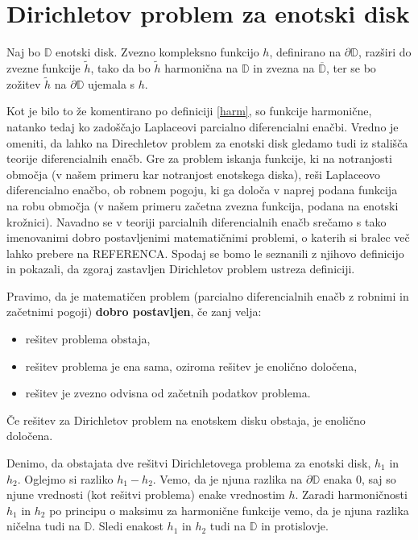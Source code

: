 \documentclass[mat1]{fmfdelo}
\begin{document}
\section{Dirichletov problem za enotski disk}
    \begin{pro}
        Naj bo $\mathbb{D}$ enotski disk. Zvezno kompleksno funkcijo $h$, definirano na $\partial \mathbb{D}$, razširi do zvezne funkcije $\widetilde{h}$, tako da bo $\widetilde{h}$ harmonična na $\mathbb{D}$ in zvezna na $\overline{\mathbb{D}}$, ter se bo zožitev $\widetilde{h}$ na $\partial \mathbb{D}$ ujemala s $h$.
    \end{pro}

    \begin{opomba}
        Kot je bilo to že komentirano po definiciji \ref{harm}, so funkcije harmonične, natanko tedaj ko zadoščajo Laplaceovi parcialno diferencialni enačbi. 
        Vredno je omeniti, da lahko na Direchletov problem za enotski disk gledamo tudi iz stališča teorije diferencialnih enačb. Gre za problem iskanja funkcije, ki na notranjosti območja (v našem primeru kar notranjost enotskega diska), reši Laplaceovo diferencialno enačbo, ob robnem pogoju, ki ga določa v naprej podana funkcija na robu območja (v našem primeru začetna zvezna funkcija, podana na enotski krožnici). 
        Navadno se v teoriji parcialnih diferencialnih enačb srečamo s tako imenovanimi dobro postavljenimi matematičnimi problemi, o katerih si bralec več lahko prebere na REFERENCA. 
        Spodaj se bomo le seznanili z njihovo definicijo in pokazali, da zgoraj zastavljen Dirichletov problem ustreza definiciji. 
    \end{opomba}

    \begin{definicija}[J. Hadamard 1902]
        Pravimo, da je matematičen problem (parcialno diferencialnih enačb z robnimi in začetnimi pogoji) \textbf{dobro postavljen}, če zanj velja:
        \begin{itemize}
            \item rešitev problema obstaja,
            \item rešitev problema je ena sama, oziroma rešitev je enolično določena,
            \item rešitev je zvezno odvisna od začetnih podatkov problema.
        \end{itemize}
    \end{definicija}

    \begin{lema}
        \label{enolicno}
        Če rešitev za Dirichletov problem na enotskem disku obstaja, je enolično določena.
    \end{lema}
    \begin{dokaz}
        Denimo, da obstajata dve rešitvi Dirichletovega problema za enotski disk, $h_1$ in $h_2$.
        Oglejmo si razliko $h_1 - h_2$. Vemo, da je njuna razlika na $\partial \mathbb{D}$ enaka $0$, saj so njune vrednosti (kot rešitvi problema) enake vrednostim $h$. 
        Zaradi harmoničnosti $h_1$ in $h_2$ po principu o maksimu za harmonične funkcije vemo, da je njuna razlika ničelna tudi na $\mathbb{D}$. Sledi enakost $h_1$ in $h_2$ tudi na $\mathbb{D}$ in protislovje. 
    \end{dokaz}
    
\end{document}
